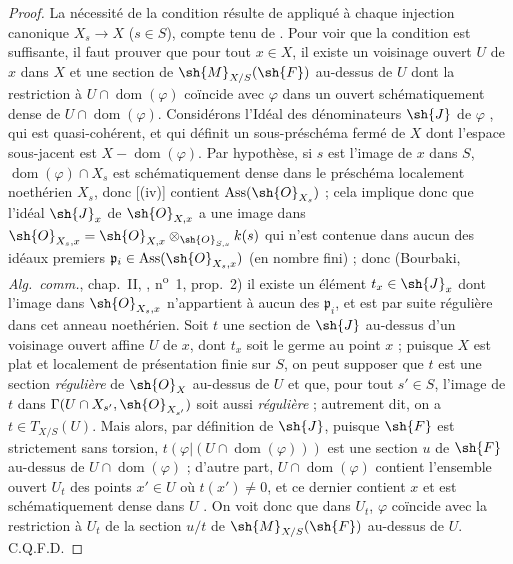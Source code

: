 \begin{proof}
La nécessité de la condition résulte de  appliqué à chaque injection canonique $X_s\to X$ ($s\in S$), compte tenu de .
Pour voir que la condition est suffisante, il faut prouver que pour tout $x\in X$, il existe un voisinage ouvert $U$ de $x$ dans $X$ et une section de $\sh{M}_{X/S}(\sh{F})$ au-dessus de $U$ dont la restriction à $U\cap\operatorname{dom}(\varphi)$ coïncide avec $\varphi$ dans un ouvert schématiquement dense de $U\cap\operatorname{dom}(\varphi)$.
Considérons l'Idéal des dénominateurs $\sh{J}$ de $\varphi$ , qui est quasi-cohérent, et qui définit un sous-préschéma fermé de $X$ dont l'espace sous-jacent est $X-\operatorname{dom}(\varphi)$.
Par hypothèse, si $s$ est l'image de $x$ dans $S$, $\operatorname{dom}(\varphi)\cap X_s$ est schématiquement dense dans le préschéma localement noethérien $X_s$, donc [(iv)] contient $\operatorname{Ass}(\sh{O}_{X_s})$ ; cela implique donc que l'idéal $\sh{J}_x$ de $\sh{O}_{X,x}$ a une image dans $\sh{O}_{X_s,x}=\sh{O}_{X,x}\otimes_{\sh{O}_{S,s}}k(s)$ qui n'est contenue dans aucun des idéaux premiers $\mathfrak{p}_i\in\operatorname{Ass}(\sh{O}_{X_s,x})$ (en nombre fini) ; donc (Bourbaki, \emph{Alg.~comm.}, chap.~II, , n\textsuperscript{o}~1, prop.~2) il existe un élément $t_x\in\sh{J}_x$ dont l'image dans $\sh{O}_{X_s,x}$ n'appartient à aucun des $\mathfrak{p}_i$, et est par suite régulière dans cet anneau noethérien.
Soit $t$ une section de $\sh{J}$ au-dessus d'un voisinage ouvert affine $U$ de $x$, dont $t_x$ soit le germe au point $x$ ; puisque $X$ est plat et localement de présentation finie sur $S$, on peut supposer  que $t$ est une section \emph{régulière} de $\sh{O}_X$ au-dessus de $U$ et que, pour tout $s'\in S$, l'image de $t$ dans $\Gamma(U\cap X_{s'},\sh{O}_{X_{s'}})$ soit aussi \emph{régulière} ; autrement dit, on a $t\in T_{X/S}(U)$.
Mais alors, par définition de $\sh{J}$, puisque $\sh{F}$ est strictement sans torsion, $t(\varphi|(U\cap\operatorname{dom}(\varphi)))$ est une section $u$ de $\sh{F}$ au-dessus de $U\cap\operatorname{dom}(\varphi)$ ; d'autre part, $U\cap\operatorname{dom}(\varphi)$ contient l'ensemble ouvert $U_t$ des points $x'\in U$ où $t(x')\neq0$, et ce dernier contient $x$ et est schématiquement dense dans $U$ .
On voit donc que dans $U_t$, $\varphi$ coïncide avec la restriction à $U_t$ de la section $u/t$ de $\sh{M}_{X/S}(\sh{F})$ au-dessus de $U$.
C.Q.F.D.
\end{proof}

